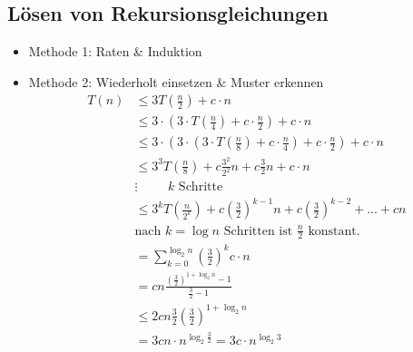 \subsection{Lösen von Rekursionsgleichungen}
\begin{itemize}
\item   Methode 1: Raten \& Induktion
\item   Methode 2: Wiederholt einsetzen \& Muster erkennen
        \begin{align*}
         T(n)   &\leq 3 T\left(\frac{n}{2}\right) + c \cdot n \\
                &\leq 3 \cdot \left(3 \cdot T\left(\frac{n}{4}\right) + c \cdot \frac{n}{2}\right) + c \cdot n \\
                &\leq 3 \cdot \left(3 \cdot  \left(3 \cdot T\left(\frac{n}{8}\right) + c \cdot \frac{n}{4}\right) + c \cdot \frac{n}{2}\right) + c \cdot n\\
                &\leq 3^3 T\left(\frac{n}{8}\right) + c \frac{3^2}{2^2}n + c \frac{3}{2}n + c \cdot n\\
                &\vdots \hspace{1cm}\text{$k$ Schritte}\\
                &\leq 3^k T\left(\frac{n}{2^k}\right) + c \left(\frac{3}{2}\right)^{k-1}n + c\left(\frac{3}{2}\right)^{k-2} + ... + cn\\
                & \text{nach $k = \log n$ Schritten ist $\frac{n}{2}$ konstant.}\\
                &= \sum\limits_{k = 0}^{\log_2 n} \left(\frac{3}{2}\right)^k c \cdot n\\
                &= cn \frac{\left(\frac{3}{2}\right)^{1 + \log_2 n} - 1}{\frac{3}{2} - 1} \tag{geometrische Reihe}\\
                &\leq 2 cn \frac{3}{2} \left(\frac{3}{2}\right)^{1 + \log_2 n}\\
                &= 3 cn \cdot n^{\log_2 \frac{3}{2}} = 3 c \cdot n^{\log_2 3}
        \end{align*}

\end{itemize}
